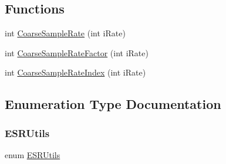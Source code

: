 \subsection*{Functions}
\begin{DoxyCompactItemize}
\item 
int \mbox{\hyperlink{a00782_ab463c18c13ba2c75b89da6c90f02d0f0}{Coarse\+Sample\+Rate}} (int i\+Rate)
\item 
int \mbox{\hyperlink{a00782_a781f007f979a98d27156a4675fd853fa}{Coarse\+Sample\+Rate\+Factor}} (int i\+Rate)
\item 
int \mbox{\hyperlink{a00782_a149fe437454807a2d3edacf8de72c2a1}{Coarse\+Sample\+Rate\+Index}} (int i\+Rate)
\end{DoxyCompactItemize}


\subsection{Enumeration Type Documentation}
\mbox{\label{a00782_a65f189058b3204334c2c13d368d8ce3e}} 
\subsubsection{\texorpdfstring{ESRUtils}{ESRUtils}}
{\footnotesize\ttfamily enum \mbox{\hyperlink{a00782_a65f189058b3204334c2c13d368d8ce3e}{E\+S\+R\+Utils}}}

